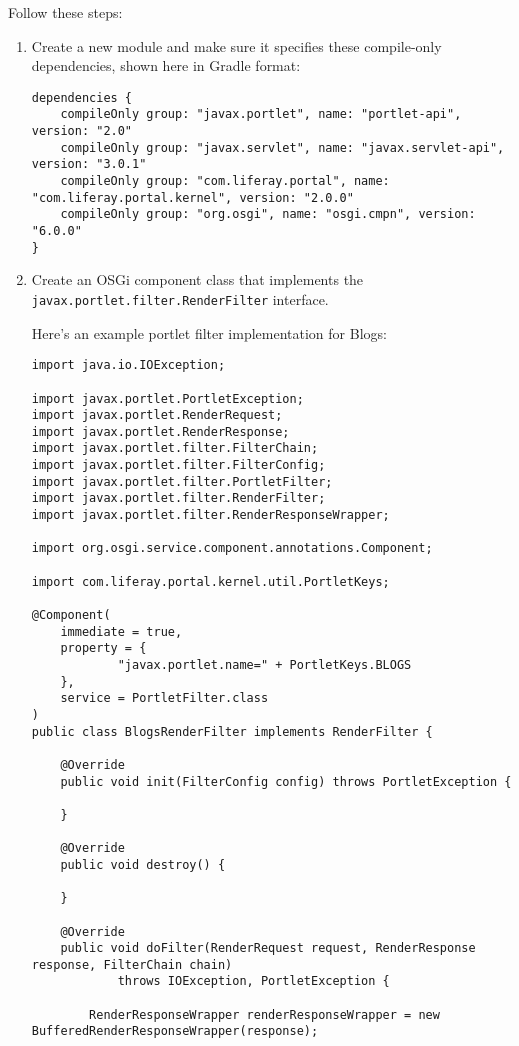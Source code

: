 Follow these steps:

\begin{enumerate}
\def\labelenumi{\arabic{enumi}.}
\item
  Create a new module and make sure it specifies these compile-only
  dependencies, shown here in Gradle format:

\begin{verbatim}
dependencies {
    compileOnly group: "javax.portlet", name: "portlet-api", version: "2.0"
    compileOnly group: "javax.servlet", name: "javax.servlet-api", version: "3.0.1"
    compileOnly group: "com.liferay.portal", name: "com.liferay.portal.kernel", version: "2.0.0"
    compileOnly group: "org.osgi", name: "osgi.cmpn", version: "6.0.0"
}
\end{verbatim}
\item
  Create an OSGi component class that implements the
  \texttt{javax.portlet.filter.RenderFilter} interface.

  Here's an example portlet filter implementation for Blogs:

\begin{verbatim}
import java.io.IOException;

import javax.portlet.PortletException;
import javax.portlet.RenderRequest;
import javax.portlet.RenderResponse;
import javax.portlet.filter.FilterChain;
import javax.portlet.filter.FilterConfig;
import javax.portlet.filter.PortletFilter;
import javax.portlet.filter.RenderFilter;
import javax.portlet.filter.RenderResponseWrapper;

import org.osgi.service.component.annotations.Component;

import com.liferay.portal.kernel.util.PortletKeys;

@Component(
    immediate = true,
    property = {
            "javax.portlet.name=" + PortletKeys.BLOGS
    },
    service = PortletFilter.class
)
public class BlogsRenderFilter implements RenderFilter {

    @Override
    public void init(FilterConfig config) throws PortletException {

    }

    @Override
    public void destroy() {

    }

    @Override
    public void doFilter(RenderRequest request, RenderResponse response, FilterChain chain)
            throws IOException, PortletException {

        RenderResponseWrapper renderResponseWrapper = new BufferedRenderResponseWrapper(response);


\end{verbatim}
\end{enumerate}
